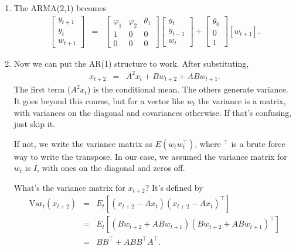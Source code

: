 \documentclass[11pt]{article}
\begin{document}
\begin{enumerate}
\begin{enumerate}
\item The ARMA(2,1) becomes
\begin{eqnarray*}
    \left[
    \begin{array}{c}
    y_{t+1} \\ y_t \\ w_{t+1}
    \end{array}
    \right]
    &=&
    \left[
    \begin{array}{ccc}
    \varphi_1 & \varphi_2 & \theta_1 \\ 1 & 0 & 0 \\ 0 & 0 & 0
    \end{array}
    \right]
    \left[
    \begin{array}{c}
    y_{t} \\ y_{t-1} \\ w_{t}
    \end{array}
    \right]
    +
    \left[
    \begin{array}{c}
    \theta_0 \\ 0 \\ 1
    \end{array}
    \right]
    [w_{t+1} ] .
\end{eqnarray*}

\item Now we can put the AR(1) structure to work.  After substituting,
\begin{eqnarray*}
    x_{t+2} &=& A^2 x_t + B w_{t+2} + A B w_{t+1} .
\end{eqnarray*}
The first term ($A^2 x_t$) is the conditional mean.
The others generate variance.  It goes beyond this course,
but for a vector like $w_t$ the variance is a matrix,
with variances on the diagonal and covariances otherwise.
If that's confusing, just skip it.

If not, we write the variance matrix as $E (w_t w_t^\top)$,
where $^\top$ is a brute force way to write the transpose.
In our case, we assumed the variance matrix for $w_t$ is $I$,
with ones on the diagonal and zeros off.

What's the variance matrix for $x_{t+2}$?
It's defined by
\begin{eqnarray*}
        \mbox{Var}_t (x_{t+2}) &=&
        E_t \left[ (x_{t+2} - A x_t) (x_{t+2} - A x_t)^\top \right] \\
                &=&
                E_t \left[ (B w_{t+2} + A B w_{t+1}) (B w_{t+2} + A B w_{t+1})^\top \right] \\
        &=& B B^\top + A B B^\top A^\top .
\end{eqnarray*}


\end{enumerate}
\end{enumerate}
\end{document}
